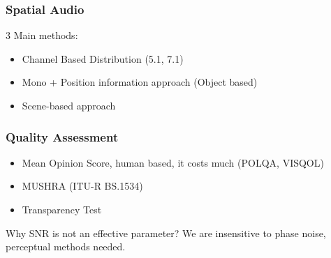 \subsubsection{Spatial Audio}
3 Main methods:
\begin{itemize}
    \item Channel Based Distribution (5.1, 7.1)
    \item Mono + Position information approach (Object based)
    \item Scene-based approach
\end{itemize}
\subsubsection{Quality Assessment}
\begin{itemize}
    \item Mean Opinion Score, human based, it costs much (POLQA, VISQOL)
    \item MUSHRA (ITU-R BS.1534)
    \item Transparency Test
\end{itemize}
Why SNR is not an effective parameter? We are insensitive to phase noise, perceptual methods needed.
